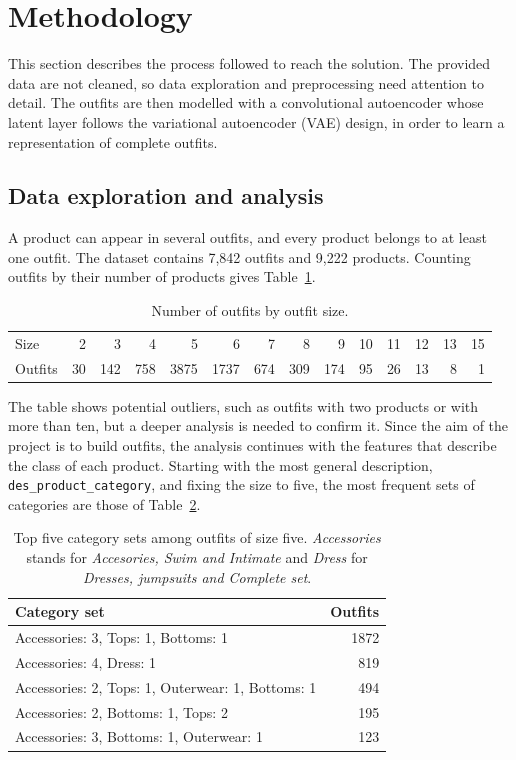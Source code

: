 \documentclass[10pt,a4paper,twocolumn]{article}
\newcommand{\code}[1]{\texttt{\small #1}}
\begin{document}
\section{Methodology}

This section describes the process followed to reach the solution. The provided data are not cleaned, so data exploration and preprocessing need attention to detail. The outfits are then modelled with a convolutional autoencoder whose latent layer follows the variational autoencoder (VAE) design, in order to learn a representation of complete outfits.

\subsection{Data exploration and analysis}

A product can appear in several outfits, and every product belongs to at least one outfit. The dataset contains 7,842 outfits and 9,222 products. Counting outfits by their number of products gives Table~\ref{tab:sizes}.

\begin{table}[tb]
\centering\footnotesize
\setlength{\tabcolsep}{2.2pt}
\begin{tabular}{l*{13}{r}}
\toprule
Size & 2 & 3 & 4 & 5 & 6 & 7 & 8 & 9 & 10 & 11 & 12 & 13 & 15 \\
Outfits & 30 & 142 & 758 & 3875 & 1737 & 674 & 309 & 174 & 95 & 26 & 13 & 8 & 1 \\
\bottomrule
\end{tabular}
\caption{Number of outfits by outfit size.}
\label{tab:sizes}
\end{table}

The table shows potential outliers, such as outfits with two products or with more than ten, but a deeper analysis is needed to confirm it. Since the aim of the project is to build outfits, the analysis continues with the features that describe the class of each product. Starting with the most general description, \code{des\_product\_category}, and fixing the size to five, the most frequent sets of categories are those of Table~\ref{tab:category}.

\begin{table}[tb]
\centering\small
\begin{tabularx}{\columnwidth}{>{\raggedright\arraybackslash}Xr}
\toprule
Category set & Outfits \\
\midrule
Accessories: 3, Tops: 1, Bottoms: 1 & 1872 \\
Accessories: 4, Dress: 1 & 819 \\
Accessories: 2, Tops: 1, Outerwear: 1, Bottoms: 1 & 494 \\
Accessories: 2, Bottoms: 1, Tops: 2 & 195 \\
Accessories: 3, Bottoms: 1, Outerwear: 1 & 123 \\
\bottomrule
\end{tabularx}
\caption{Top five category sets among outfits of size five. \emph{Accessories} stands for \emph{Accesories, Swim and Intimate} and \emph{Dress} for \emph{Dresses, jumpsuits and Complete set}.}
\label{tab:category}
\end{table}
\end{document}
